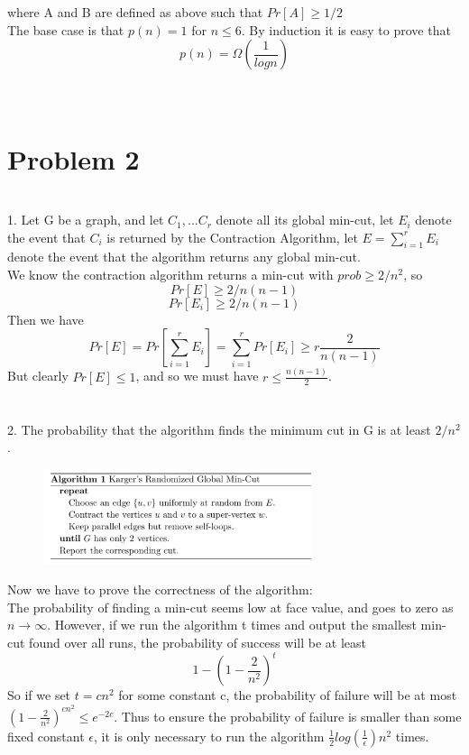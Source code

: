 \documentclass{article}
\begin{document}
where A and B are defined as above such that $Pr[A]\ge 1/2$\\
The base case is that $p(n )= 1 $ for $n\le 6$.  By induction it is easy to prove that\\
$$p(n) = \Omega(\frac{1}{logn})$$
\\
\\	
\section*{Problem 2}
\quad\\
1. Let G  be a graph, and let $C_1,...C_r$ denote all its global min-cut, let $E_i$ denote the event that $C_i$  is returned by the Contraction Algorithm, let $E = \sum_{i=1}^{r}E_i$denote the event that the algorithm returns any global min-cut.\\
We know the contraction algorithm returns a min-cut with $prob \ge 2/n^2$, so\\
$$Pr[E] \ge 2/n(n-1)$$
$$Pr[E_i] \ge 2/n(n-1)$$
Then we have \\
$$Pr[E] = Pr[\sum_{i=1}^{r}E_i] = \sum_{i=1}^{r}Pr[E_i] \ge r \frac{2}{n(n-1)}$$ 
But clearly $Pr[E] \le 1$, and so we must have $r\le \frac{n(n-1)}{2}$.\\
\\
\\
2. The probability that the algorithm finds the minimum cut in G is at least $2/n^2$.\\
\begin{figure}[H]

	\includegraphics[width=0.7\textwidth]{1.png}
	
\end{figure}
Now we have to prove the correctness of the algorithm:\\
The probability of finding a min-cut seems low at face value, and goes to zero as $n \rightarrow \infty$. However, if we run the algorithm t times and output the smallest min-cut found over all runs, the probability of success
will be at least\\
$$1- (1- \frac{2}{n^2})^t$$
So if we set $t = cn^2$ for some constant c, the probability of failure will be at most $(1- \frac{2}{n^2})^{cn^2}\le e^{-2c}$. Thus to ensure the probability of failure is smaller than some fixed constant $\epsilon$, it is only necessary to run the algorithm $\frac{1}{2}log(\frac{1}{\epsilon})n^2$ times.\\
\\
\\
\end{document}

